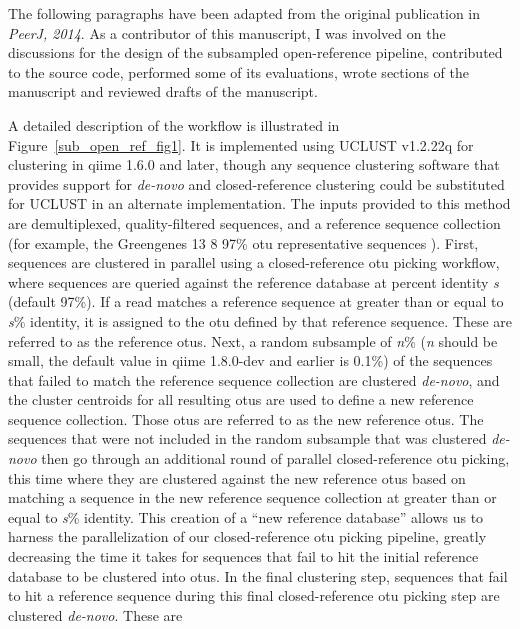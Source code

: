 The following paragraphs have been adapted from the original publication in
\textsl{PeerJ, 2014}. As a contributor of this manuscript, I was involved on the
discussions for the design of the subsampled open-reference pipeline, contributed
to the source code, performed some of its evaluations, wrote sections of the
manuscript and reviewed drafts of the manuscript.

A detailed description of the workflow is illustrated in Figure~\ref{sub_open_ref_fig1}.
It is implemented using UCLUST v1.2.22q \cite{Edgar2010} for clustering in \gls{qiime} 1.6.0 \cite{Caporaso2010}
and later, though any sequence clustering software that provides support for \emph{de-novo}
and closed-reference clustering could be substituted for UCLUST in an alternate
implementation. The inputs provided to this method are demultiplexed,
quality-filtered sequences, and a reference sequence collection (for example,
the Greengenes 13 8 97\% \gls{otu} representative sequences \cite{DeSantis2006, McDonald2012}).
First, sequences are clustered in parallel using a closed-reference \gls{otu} picking
workflow, where sequences are queried against the reference database at percent
identity \emph{s} (default 97\%). If a read matches a reference sequence at greater
than or equal to \emph{s}\% identity, it is assigned to the \gls{otu} defined by that
reference sequence. These are referred to as the reference \gls{otu}s. Next, a
random subsample of \emph{n}\% (\emph{n} should be small, the default value in
\gls{qiime} 1.8.0-dev and earlier is 0.1\%) of the sequences that failed to match
the reference sequence collection are clustered \emph{de-novo}, and the cluster
centroids for all resulting \gls{otu}s are used to define a new reference sequence
collection. Those \gls{otu}s are referred to as the new reference \gls{otu}s.
The sequences that were not included in the random subsample that was clustered
\emph{de-novo} then go through an additional round of parallel closed-reference \gls{otu}
picking, this time where they are clustered against the new reference \gls{otu}s based
on matching a sequence in the new reference sequence collection at greater than
or equal to \emph{s}\% identity. This creation of a “new reference database”
allows us to harness the parallelization of our closed-reference \gls{otu} picking
pipeline, greatly decreasing the time it takes for sequences that fail to hit the
initial reference database to be clustered into \gls{otu}s. In the final clustering
step, sequences that fail to hit a reference sequence during this final
closed-reference \gls{otu} picking step are clustered \emph{de-novo}. These are
